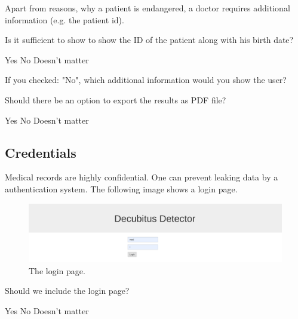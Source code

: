 \documentclass{exam}
\begin{document}
Apart from reasons, why a patient is endangered, a doctor requires additional information (e.g. the patient id). 

\begin{questions}
\question Is it sufficient to show to show the ID of the patient along with his birth date?

\begin{checkboxes}
	\choice Yes
	\choice No
	\choice Doesn't matter
\end{checkboxes}

If you checked: "No", which additional information would you show the user?
\vspace{5cm}

\question Should there be an option to export the results as PDF file?

\begin{checkboxes}
	\choice Yes
	\choice No
	\choice Doesn't matter
\end{checkboxes}

\end{questions}

\subsection*{Credentials}

Medical records are highly confidential. One can prevent leaking data by a authentication system. The following image shows a login page.

\begin{figure}[H]
	\centering
  \includegraphics[width=0.8\linewidth]{images/login.png}
	\captionsetup{labelformat=empty}
	\caption{The login page.}
  \label{fig:text}
\end{figure}

\begin{questions}
	\question Should we include the login page?

	\begin{checkboxes}
		\choice Yes
		\choice No
		\choice Doesn't matter
	\end{checkboxes}

\end{questions}
\end{document}
